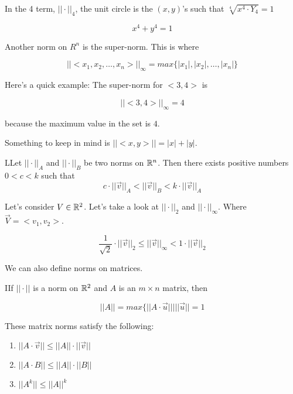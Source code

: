 	In the 4 term, $| | \cdot | |_4$, the unit circle is the $(x,y)$'s such that $\sqrt[4]{x^4\cdot Y_4} =1$

	\begin{equation}
		\boxed{x^4+y^4=1}
	\end{equation}

	Another norm on $R^n$ is the super-norm. This is where

	\begin{equation}
		| |<x_1,x_2,\ldots,x_n>| |_\infty = max\{|x_1|,|x_2|,\ldots,|x_n|\}	
	\end{equation}

	Here's a quick example: The super-norm for $<3,4>$ is 

	\begin{equation}
		| | <3,4> | |_\infty=4
	\end{equation}

	because the maximum value in the set is $4$.

	Something to keep in mind is $| | <x,y> | |=|x|+|y|$.

	\begin{theorem}
		LLet $| | \cdot | |_A$ and $| | \cdot | |_B$ be two norms on $\mathbb{R}^n$. Then there exists positive numbers $0<c<k$ such that 
		\begin{equation}
			c\cdot| | \vec{v} | |_A<| | \vec{v} | |_B<k \cdot | | \vec{v} | |_A
		\end{equation}
	\end{theorem}
		Let's consider $V\in\mathbb{R}^2$. Let's take a look at $| | \cdot | |_2$ and $| | \cdot | | _\infty$. Where $\vec{V}= <v_1,v_2>$.

	\begin{equation}
		\frac{1}{\sqrt{2} }\cdot | | \vec{v} | |_2\le | | \vec{v} | | _\infty < 1\cdot | | \vec{v} | |_2
	\end{equation}

	We can also define norms on matrices.

	\begin{theorem}
		IIf $| | \cdot | |$ is a norm on $\mathbb{R}^2$ and $A$ is an $m\times n$ matrix, then

		\begin{equation}
			| | A | | = max\{| | A\cdot\vec{u}| | \Big| | |\vec{u} | | = 1
		\end{equation}
	\end{theorem}

	These matrix norms satisfy the following:

	\begin{enumerate}
		\item $| | A\cdot\vec{v} | | \le | | A | | \cdot | | \vec{v} | |$
		\item $ | | A\cdot B | | \le | | A | | \cdot | | B | |$
		\item $| | A^k| | \le | | A | | ^k$
	\end{enumerate}

